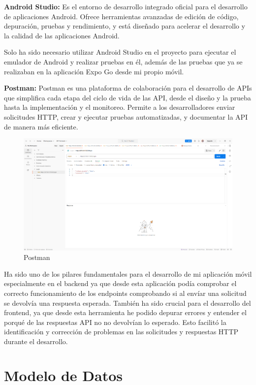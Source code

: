 \textbf{Android Studio:} Es el entorno de desarrollo integrado oficial para el desarrollo de aplicaciones Android. Ofrece herramientas avanzadas de edición de código, depuración, pruebas y rendimiento, y está diseñado para acelerar el desarrollo y la calidad de las aplicaciones Android. \cite{android}

Solo ha sido necesario utilizar Android Studio en el proyecto para ejecutar el emulador de Android y realizar pruebas en él, además de las pruebas que ya se realizaban en la aplicación Expo Go desde mi propio móvil.

\textbf{Postman:}  Postman es una plataforma de colaboración para el desarrollo de APIs que simplifica cada etapa del ciclo de vida de las API, desde el diseño y la prueba hasta la implementación y el monitoreo. Permite a los desarrolladores enviar solicitudes HTTP, crear y ejecutar pruebas automatizadas, y documentar la API de manera más eficiente. \cite{postman}

\begin{figure}[H]
    \centering
    \includegraphics[width=1.0\textwidth]{imagenes/Postman.png}
    \caption{Postman}
    \label{fig:postman}
\end{figure}

Ha sido uno de los pilares fundamentales para el desarrollo de mi aplicación móvil especialmente en el backend ya que desde esta aplicación podía comprobar el correcto funcionamiento de los endpoints comprobando si al envíar una solicitud se devolvía una respuesta esperada. También ha sido crucial para el desarrollo del frontend, ya que desde esta herramienta he podido depurar errores y entender el porqué de las respuestas API no no devolvían lo esperado. Esto facilitó la identificación y corrección de problemas en las solicitudes y respuestas HTTP durante el desarrollo.

\section{Modelo de Datos}

